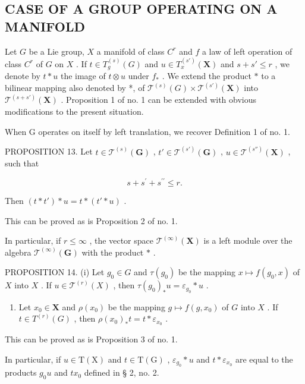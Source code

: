 \subsection{CASE OF A GROUP OPERATING ON A MANIFOLD}

Let \(G\) be a Lie group, \(X\) a manifold of class \(C^r\) and \(f\) a law of left operation of class \(C^r\) of \(G\) on \(X\) . If \(t \in T_g^{(s)}(G)\) and \(u \in T_x^{(s')}(\mathbf{X})\) and \(s + s' \leqslant r\) , we denote by \(t * u\) the image of \(t \otimes u\) under \(f_*\) . We extend the product \(*\) to a bilinear mapping also denoted by *, of \(\mathcal{T}^{(s)}(G) \times \mathcal{T}^{(s')}(\mathbf{X})\) into \(\mathcal{T}^{(s+s')}(\mathbf{X})\) . Proposition 1 of no. 1 can be extended with obvious modifications to the present situation.

When G operates on itself by left translation, we recover Definition 1 of no. 1.

PROPOSITION 13. Let \(t \in \mathcal{T}^{(s)}(\mathbf{G})\) , \(t' \in \mathcal{T}^{(s')}(\mathbf{G})\) , \(u \in \mathcal{T}^{(s'')}(\mathbf{X})\) , such that

\[
s + s ^ {\prime} + s ^ {\prime \prime} \leqslant r.
\]

Then \((t*t')*u=t*(t'*u)\) .

This can be proved as is Proposition 2 of no. 1.

In particular, if \(r \leqslant \infty\) , the vector space \(\mathcal{T}^{(\infty)}(\mathbf{X})\) is a left module over the algebra \(\mathcal{T}^{(\infty)}(\mathbf{G})\) with the product \(*\) .

PROPOSITION 14. (i) Let \(g_0 \in G\) and \(\tau(g_0)\) be the mapping \(x \mapsto f(g_0, x)\) of \(X\) into \(X\) . If \(u \in \mathcal{T}^{(r)}(X)\) , then \(\tau(g_0)_*u = \varepsilon_{g_0} * u\) .

\begin{enumerate}
\def\labelenumi{(\roman{enumi})}
\setcounter{enumi}{1}
\tightlist
\item
  Let \(x_0 \in \mathbf{X}\) and \(\rho(x_0)\) be the mapping \(g \mapsto f(g, x_0)\) of \(G\) into \(X\) . If \(t \in T^{(r)}(G)\) , then \(\rho(x_0)_*t = t * \varepsilon_{x_0}\) .
\end{enumerate}

This can be proved as is Proposition 3 of no. 1.

In particular, if \(u \in \mathrm{T}(\mathrm{X})\) and \(t \in \mathrm{T}(\mathrm{G})\) , \(\varepsilon_{g_0} * u\) and \(t * \varepsilon_{x_0}\) are equal to the products \(g_0u\) and \(tx_0\) defined in § 2, no. 2.

